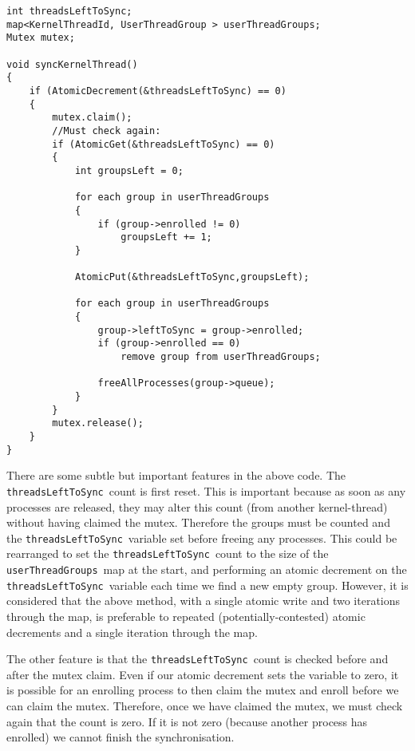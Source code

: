 \documentclass[12pt]{IOS-Book-Article-CPA-2007}
\newcommand{\code}[1]{{\small\texttt{#1}}}
\begin{document}
{\small\begin{verbatim}
int threadsLeftToSync;
map<KernelThreadId, UserThreadGroup > userThreadGroups;
Mutex mutex;

void syncKernelThread()
{
    if (AtomicDecrement(&threadsLeftToSync) == 0)
    {
        mutex.claim();
        //Must check again:
        if (AtomicGet(&threadsLeftToSync) == 0)
        {
            int groupsLeft = 0;
            
            for each group in userThreadGroups
            {
                if (group->enrolled != 0)
                    groupsLeft += 1;
            }

            AtomicPut(&threadsLeftToSync,groupsLeft);
            
            for each group in userThreadGroups
            {
                group->leftToSync = group->enrolled;
                if (group->enrolled == 0)
                    remove group from userThreadGroups;
                 
                freeAllProcesses(group->queue);
            }
        }
        mutex.release();
    }
}
\end{verbatim}}

There are some subtle but important features in the above code.  The \code{threadsLeftToSync}\ count is first reset.  This is important because
as soon as any processes are released, they may alter this count (from another kernel-thread) without having claimed the mutex.  Therefore the groups must be counted and the \code{threadsLeftToSync}~variable
set before freeing any processes.  This could be rearranged to set the \code{threadsLeftToSync}~count to the size of the \code{userThreadGroups}~map at the start, and performing an atomic decrement on the \code{threadsLeftToSync}~variable each time we
find a new empty group.  However, it is considered that the above method, with a single atomic write and two iterations through the map, is preferable 
to repeated (potentially-contested) atomic decrements and a single iteration through the map.

The other feature is that the \code{threadsLeftToSync}~count is checked before and after the mutex claim.  Even if our atomic decrement sets the 
variable to zero, it is possible for an enrolling process to then claim the mutex and enroll before we can claim the mutex.  Therefore, once we have claimed
the mutex, we must check again that the count is zero.  If it is not zero (because another process has enrolled) we cannot finish the synchronisation.
\end{document}
